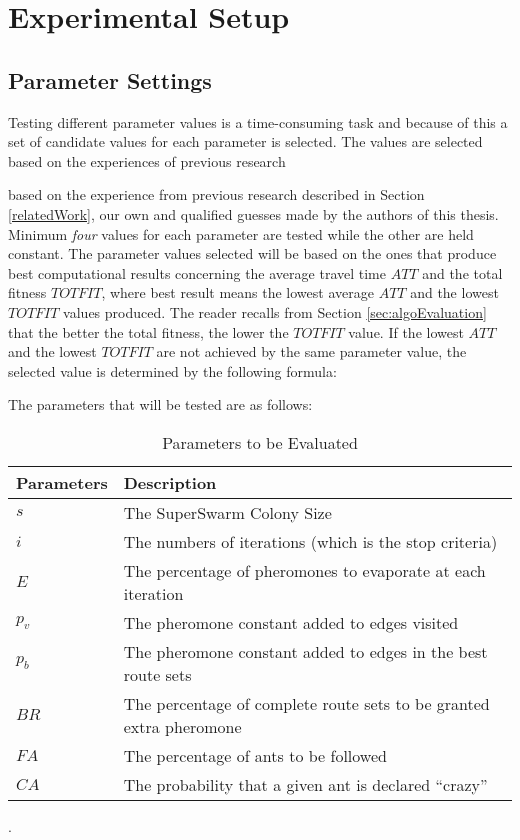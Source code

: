 \section{Experimental Setup}

 
\subsection{Parameter Settings}
\label{subsec:parameterSettings_setup}

Testing different parameter values is a time-consuming task and because of this a set of candidate values for each parameter is selected. The values are selected based on the experiences of previous research  


 based on the experience from previous research described in Section \vref{relatedWork}, our own  and qualified guesses made by the authors of this thesis. Minimum \textit{four} values for each parameter are tested while the other are held constant. The parameter values selected will be based on the ones that produce best computational results concerning the average travel time $ATT$ and the total fitness $TOTFIT$, where best result means the lowest average $ATT$ and the lowest $TOTFIT$ values produced. The reader recalls from Section \vref{sec:algoEvaluation} that the better the total fitness, the lower the $TOTFIT$ value. If the lowest $ATT$ and the lowest $TOTFIT$ are not achieved by the same parameter value, the selected value is determined by the following formula:

The parameters that will be tested are as follows:
\begin{table}[H]
	\begin{tabular}{|l|l|}
    	\hline
    	Parameters & Description\\
    	\hline
    	$s$ & The SuperSwarm Colony Size\\
    	$i$ & The numbers of iterations (which is the stop criteria)\\
    	$E$ & The percentage of pheromones to evaporate at each iteration\\
    	$p_v$ & The pheromone constant added to edges visited\\
    	$p_b$ & The pheromone constant added to edges in the best route sets\\
    	$BR$ & The percentage of complete route sets to be granted extra pheromone\\
    	$FA$ & The percentage of ants to be followed\\
    	$CA$ & The probability that a given ant is declared ``crazy''\\
   	    \hline
    \end{tabular}
    \caption {Parameters to be Evaluated}.
    \label{table:parameters}
\end{table}

